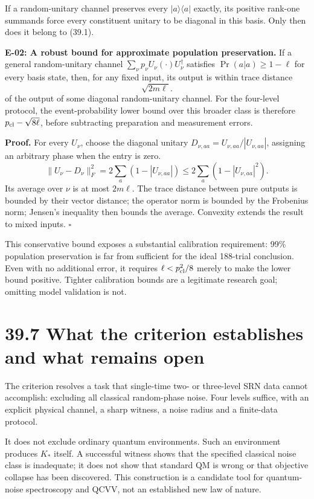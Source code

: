 \documentclass[
  11pt,
  oneside]{book}
\begin{document}
If a random-unitary channel preserves every \(|a\rangle\langle a|\)
exactly, its positive rank-one summands force every constituent unitary
to be diagonal in this basis. Only then does it belong to (39.1).

\label{e-02}{}

\textbf{E-02: A robust bound for approximate population preservation.}
If a general random-unitary channel
\(\sum_\nu p_\nu U_\nu(\cdot)U_\nu^\dagger\) satisfies
\(\Pr(a|a)\ge1-\ell\) for every basis state, then, for any fixed input,
its output is within trace distance \[
\sqrt{2m\ell}.
\tag{39.12}
\] of the output of some diagonal random-unitary channel. For the
four-level protocol, the event-probability lower bound over this broader
class is therefore \(p_{\rm cl}-\sqrt{8\ell}\), before subtracting
preparation and measurement errors.

\textbf{Proof.} For every \(U_\nu\), choose the diagonal unitary
\(D_{\nu,aa}=U_{\nu,aa}/|U_{\nu,aa}|\), assigning an arbitrary phase
when the entry is zero. \[
\|U_\nu-D_\nu\|_F^2=2\sum_a(1-|U_{\nu,aa}|)
\le2\sum_a(1-|U_{\nu,aa}|^2).
\] Its average over \(\nu\) is at most \(2m\ell\). The trace distance
between pure outputs is bounded by their vector distance; the operator
norm is bounded by the Frobenius norm; Jensen's inequality then bounds
the average. Convexity extends the result to mixed inputs. \(\square\)

This conservative bound exposes a substantial calibration requirement:
99\% population preservation is far from sufficient for the ideal
188-trial conclusion. Even with no additional error, it requires
\(\ell<p_{\rm cl}^2/8\) merely to make the lower bound positive. Tighter
calibration bounds are a legitimate research goal; omitting model
validation is not.

\section{39.7 What the criterion establishes and what remains open}

The criterion resolves a task that single-time two- or three-level SRN
data cannot accomplish: excluding all classical random-phase noise. Four
levels suffice, with an explicit physical channel, a sharp witness, a
noise radius and a finite-data protocol.

It does not exclude ordinary quantum environments. Such an environment
produces \(K_*\) itself. A successful witness shows that the specified
classical noise class is inadequate; it does not show that standard QM
is wrong or that objective collapse has been discovered. This
construction is a candidate tool for quantum-noise spectroscopy and
QCVV, not an established new law of nature.
\end{document}
